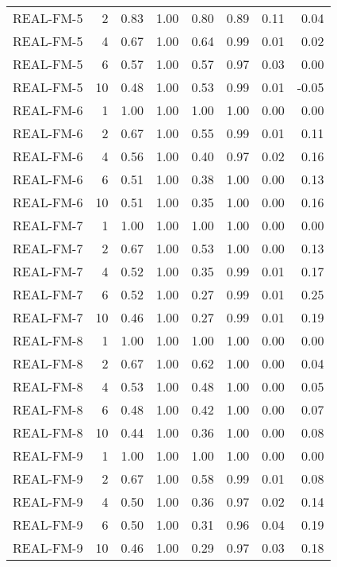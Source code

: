 \begin{table}[ht]
\begin{tabular}{lrrrrrrr}
  REAL-FM-5 &   2 & 0.83 & 1.00 & 0.80 & 0.89 & 0.11 & 0.04 \\ 
  REAL-FM-5 &   4 & 0.67 & 1.00 & 0.64 & 0.99 & 0.01 & 0.02 \\ 
  REAL-FM-5 &   6 & 0.57 & 1.00 & 0.57 & 0.97 & 0.03 & 0.00 \\ 
  REAL-FM-5 &  10 & 0.48 & 1.00 & 0.53 & 0.99 & 0.01 & -0.05 \\ 
  REAL-FM-6 &   1 & 1.00 & 1.00 & 1.00 & 1.00 & 0.00 & 0.00 \\ 
  REAL-FM-6 &   2 & 0.67 & 1.00 & 0.55 & 0.99 & 0.01 & 0.11 \\ 
  REAL-FM-6 &   4 & 0.56 & 1.00 & 0.40 & 0.97 & 0.02 & 0.16 \\ 
  REAL-FM-6 &   6 & 0.51 & 1.00 & 0.38 & 1.00 & 0.00 & 0.13 \\ 
  REAL-FM-6 &  10 & 0.51 & 1.00 & 0.35 & 1.00 & 0.00 & 0.16 \\ 
  REAL-FM-7 &   1 & 1.00 & 1.00 & 1.00 & 1.00 & 0.00 & 0.00 \\ 
  REAL-FM-7 &   2 & 0.67 & 1.00 & 0.53 & 1.00 & 0.00 & 0.13 \\ 
  REAL-FM-7 &   4 & 0.52 & 1.00 & 0.35 & 0.99 & 0.01 & 0.17 \\ 
  REAL-FM-7 &   6 & 0.52 & 1.00 & 0.27 & 0.99 & 0.01 & 0.25 \\ 
  REAL-FM-7 &  10 & 0.46 & 1.00 & 0.27 & 0.99 & 0.01 & 0.19 \\ 
  REAL-FM-8 &   1 & 1.00 & 1.00 & 1.00 & 1.00 & 0.00 & 0.00 \\ 
  REAL-FM-8 &   2 & 0.67 & 1.00 & 0.62 & 1.00 & 0.00 & 0.04 \\ 
  REAL-FM-8 &   4 & 0.53 & 1.00 & 0.48 & 1.00 & 0.00 & 0.05 \\ 
  REAL-FM-8 &   6 & 0.48 & 1.00 & 0.42 & 1.00 & 0.00 & 0.07 \\ 
  REAL-FM-8 &  10 & 0.44 & 1.00 & 0.36 & 1.00 & 0.00 & 0.08 \\ 
  REAL-FM-9 &   1 & 1.00 & 1.00 & 1.00 & 1.00 & 0.00 & 0.00 \\ 
  REAL-FM-9 &   2 & 0.67 & 1.00 & 0.58 & 0.99 & 0.01 & 0.08 \\ 
  REAL-FM-9 &   4 & 0.50 & 1.00 & 0.36 & 0.97 & 0.02 & 0.14 \\ 
  REAL-FM-9 &   6 & 0.50 & 1.00 & 0.31 & 0.96 & 0.04 & 0.19 \\ 
  REAL-FM-9 &  10 & 0.46 & 1.00 & 0.29 & 0.97 & 0.03 & 0.18 \\ 
   \hline
\end{tabular}
\end{table}
